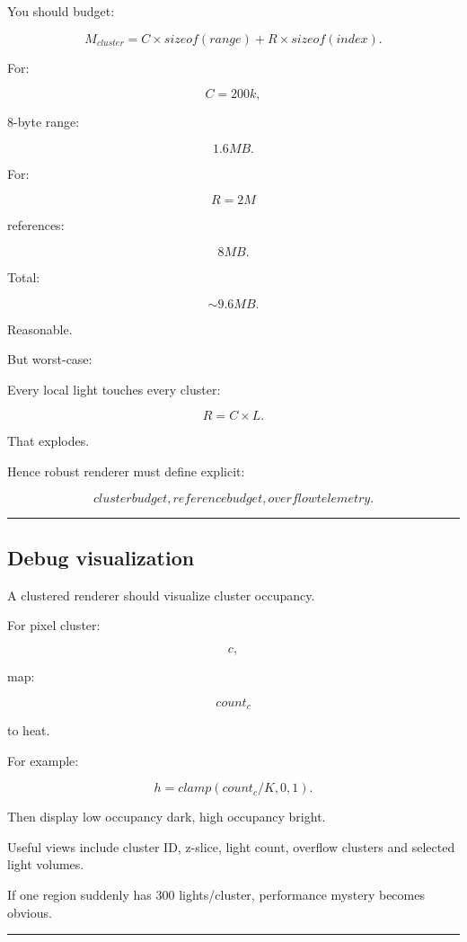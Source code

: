 You should budget:

\[
M_{cluster}
=
C\times sizeof(range)
+
R\times sizeof(index).
\]

For:

\[
C=200k,
\]

8-byte range:

\[
1.6MB.
\]

For:

\[
R=2M
\]

references:

\[
8MB.
\]

Total:

\[
\sim9.6MB.
\]

Reasonable.

But worst-case:

Every local light touches every cluster:

\[
R=C\times L.
\]

That explodes.

Hence robust renderer must define explicit:

\[
\boxed{
cluster budget,
reference budget,
overflow telemetry.
}
\]

\begin{center}\rule{0.5\linewidth}{0.5pt}\end{center}

\subsection{Debug visualization}\label{04-visual-computing-ii-ch040-debug-visualization}

A clustered renderer should visualize cluster occupancy.

For pixel cluster:

\[
c,
\]

map:

\[
count_c
\]

to heat.

For example:

\[
h=
clamp(
count_c/K,
0,1
).
\]

Then display low occupancy dark, high occupancy bright.

Useful views include cluster ID, z-slice, light count, overflow clusters and selected light volumes.

If one region suddenly has 300 lights/cluster, performance mystery becomes obvious.

\begin{center}\rule{0.5\linewidth}{0.5pt}\end{center}

